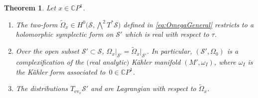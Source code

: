 \documentclass[pdftex]{sigma}
\numberwithin{equation}{section}
\newtheorem{Theorem}{Theorem}[section]
\theoremstyle{definition}
\newcommand\C{{\mathbb C}}
\begin{document}
\begin{Theorem}\label{thm:Omega}
Let $x \in \C P^1$.
\begin{enumerate}[$(a)$]\itemsep=0pt
\item The two-form $\widetilde \Omega_x \in H^0\bigl(\mathcal S, \bigwedge^2T^*\mathcal S\bigr)$ defined in \eqref{eq:OmegaGeneral} restricts to a holomorphic symplectic form on $\mathcal{S}'$ which is real with respect to $\tau$.

\item Over the open subset $\mathcal S' \subset \mathcal S$,
$\Omega_x\vert_{\mathcal S'} = \widetilde\Omega_x\vert_{\mathcal S'} $.
In particular, $(\mathcal{S}', \Omega_0)$ is a complexification of the $($real analytic$)$ K\"ahler manifold
$(M', \omega_I)$, where $\omega_I$ is the K\"ahler form associated to~${0 \in \C P^1}$.

\item The distributions $T_{\operatorname{ev}_x}\mathcal S'$ and \smash{$T_{\operatorname{ev}_{\tau_{\C P^1}(x)}}\mathcal S'$} are
Lagrangian with respect to $\widetilde\Omega_x$.
\end{enumerate}
\end{Theorem}
\end{document}
